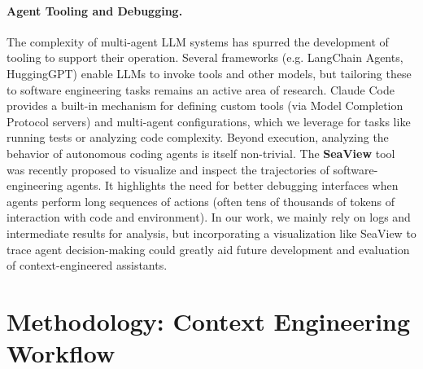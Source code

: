 \documentclass[11pt]{article}
\begin{document}
\paragraph{Agent Tooling and Debugging.}
The complexity of multi-agent LLM systems has spurred the development of tooling to support their operation. Several frameworks (e.g. LangChain Agents, HuggingGPT) enable LLMs to invoke tools and other models, but tailoring these to software engineering tasks remains an active area of research. Claude Code provides a built-in mechanism for defining custom tools (via Model Completion Protocol servers) and multi-agent configurations, which we leverage for tasks like running tests or analyzing code complexity. Beyond execution, analyzing the behavior of autonomous coding agents is itself non-trivial. The \textbf{SeaView} tool \cite{seaview2025} was recently proposed to visualize and inspect the trajectories of software-engineering agents. It highlights the need for better debugging interfaces when agents perform long sequences of actions (often tens of thousands of tokens of interaction with code and environment). In our work, we mainly rely on logs and intermediate results for analysis, but incorporating a visualization like SeaView to trace agent decision-making could greatly aid future development and evaluation of context-engineered assistants.

\section{Methodology: Context Engineering Workflow}
\end{document}
